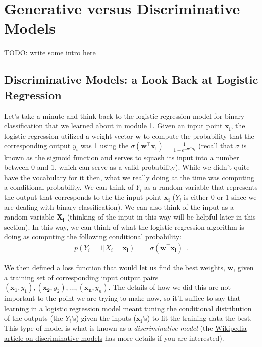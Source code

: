\documentclass[assignment02_Solutions]{subfiles}
\begin{document}
\section{Generative versus Discriminative Models}
TODO: write some intro here

\subsection{Discriminative Models: a Look Back at Logistic Regression}

Let's take a minute and think back to the logistic regression model for binary classification that we learned about in module 1.  Given an input point $\mathbf{x_i}$, the logistic regression utilized a weight vector $\mathbf{w}$ to compute the probability that the corresponding output $y_i$ was 1 using the $\sigma(\mathbf{w}^\top \mathbf{x_i}) = \frac{1}{1+e^{-\mathbf{w}^\top \mathbf{x_i}}}$ (recall that $\sigma$ is known as the sigmoid function and serves to squash its input into a number between 0 and 1, which can serve as a valid probability).  While we didn't quite have the vocabulary for it then, what we really doing at the time was computing a conditional probability.  We can think of $Y_i$ as a random variable that represents the output that corresponds to the the input point $\mathbf{x_i}$ ($Y_i$ is either 0 or 1 since we are dealing with binary classification).  We can also think of the input as a random variable $\mathbf{X_i}$ (thinking of the input in this way will be helpful later in this section).  In this way, we can think of what the logistic regression algorithm is doing as computing the following conditional probability:
\begin{align}
p(Y_i = 1 | X_i = \mathbf{x_i}) &= \sigma(\mathbf{w}^\top \mathbf{x_i}) \enspace .
\end{align}

We then defined a loss function that would let us find the best weights, $\mathbf{w}$, given a training set of corresponding input output pairs $(\mathbf{x_1}, y_1), (\mathbf{x_2}, y_2), \ldots, (\mathbf{x_n}, y_n)$.  The details of how we did this are not important to the point we are trying to make now, so it'll suffice to say that learning in a logistic regression model meant tuning the conditional distribution of the outputs (the $Y_i$'s) given the inputs ($\mathbf{x_i}$'s) to fit the training data the best.  This type of model is what is known as a \emph{discriminative model} (the \href{https://en.wikipedia.org/wiki/Discriminative_model}{Wikipedia article on discriminative models} has more details if you are interested).
\end{document}

